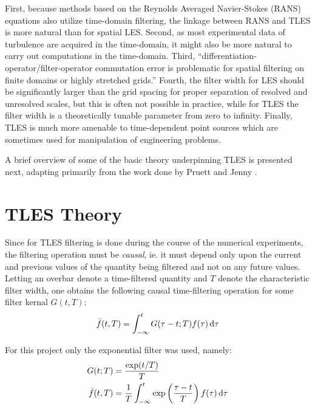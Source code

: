 First, because methods based on the Reynolds Averaged Navier-Stokes (RANS) equations also utilize time-domain filtering, the linkage between RANS and TLES is more natural than for spatial LES. Second, as most experimental data of turbulence are acquired in the time-domain, it might also be more natural to carry out computations in the time-domain. Third, ``differentiation-operator/filter-operator commutation error is problematic for spatial filtering on finite domains or highly stretched grids.'' Fourth, the filter width for LES should be significantly larger than the grid spacing for proper separation of resolved and unresolved scales, but this is often not possible in practice, while for TLES the filter width is a theoretically tunable parameter from zero to infinity. Finally, TLES is much more amenable to time-dependent point sources which are sometimes used for manipulation of engineering problems.

A brief overview of some of the basic theory underpinning TLES is presented next, adapting primarily from the work done by Pruett \cite{Pruett2008} and Jenny \cite{Jenny2016}.

\section{TLES Theory} \label{TLES_theory}

Since for TLES filtering is done during the course of the numerical experiments, the filtering operation must be \emph{causal}, ie. it must depend only upon the current and previous values of the quantity being filtered and not on any future values. Letting an overbar denote a time-filtered quantity and $T$ denote the characteristic filter width, one obtains the following causal time-filtering operation for some filter kernal $G(t,T)$:
\begin{equation}
\bar{f}(t,T)=\int_{-\infty}^{t}G(\tau -t;T)f(\tau)\mathop{}\!\mathrm{d}\tau
\end{equation}

For this project only the exponential filter was used, namely:
\begin{equation}
\begin{split}
G(t;T)&=\frac{\exp(t/T)}{T} \\
\bar{f}(t,T)&=\frac{1}{T}\int_{-\infty}^{t}\exp\left(\frac{\tau-t}{T}\right)f(\tau)\mathop{}\!\mathrm{d}\tau
\end{split}
\end{equation}

